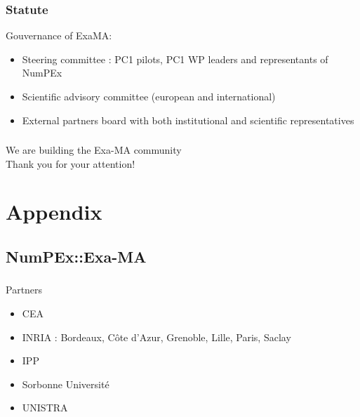 \begin{frame}
  \frametitle{Statute}
  
  Gouvernance of ExaMA:
  \begin{itemize}
    \item Steering committee : PC1 pilots, PC1 WP leaders and representants of NumPEx 
    \item Scientific advisory committee (european and international)
    \item \alert{External partners board with both institutional and scientific representatives}
  \end{itemize}

   

\end{frame}


\begin{frame}
  \frametitle{}
  \framesubtitle{}

  \begin{center}
    \LARGE We are building the Exa-MA community \\[1cm]

    Thank you for your attention!
  \end{center}
  
  

\end{frame}

\appendix
\section{Appendix}
\subsection{NumPEx::Exa-MA}

\begin{frame}
  \frametitle{\insertsectionhead}
  \framesubtitle{\insertsubsectionhead}

  Partners
  \begin{itemize}
    \item CEA 
    \item INRIA : Bordeaux,  Côte d'Azur, Grenoble, Lille, Paris, Saclay
    \item IPP 
    \item Sorbonne Université 
    \item UNISTRA  
  \end{itemize}
\end{frame}


